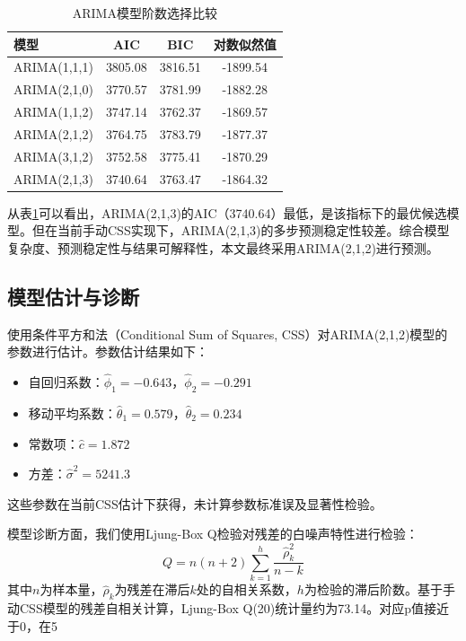 \documentclass[12pt,a4paper]{article}
\begin{document}
\begin{table}[H]
\centering
\caption{ARIMA模型阶数选择比较}
\label{tab:model_compare}
\small
\begin{tabular}{lccc}
\toprule
\textbf{模型} & \textbf{AIC} & \textbf{BIC} & \textbf{对数似然值} \\
\midrule
ARIMA(1,1,1) & 3805.08 & 3816.51 & -1899.54 \\
ARIMA(2,1,0) & 3770.57 & 3781.99 & -1882.28 \\
ARIMA(1,1,2) & 3747.14 & 3762.37 & -1869.57 \\
ARIMA(2,1,2) & 3764.75 & 3783.79 & -1877.37 \\
ARIMA(3,1,2) & 3752.58 & 3775.41 & -1870.29 \\
ARIMA(2,1,3) & 3740.64 & 3763.47 & -1864.32 \\
\bottomrule
\end{tabular}
\end{table}

从表\ref{tab:model_compare}可以看出，ARIMA(2,1,3)的AIC（3740.64）最低，是该指标下的最优候选模型。但在当前手动CSS实现下，ARIMA(2,1,3)的多步预测稳定性较差。综合模型复杂度、预测稳定性与结果可解释性，本文最终采用ARIMA(2,1,2)进行预测。

\subsection{模型估计与诊断}

使用条件平方和法（Conditional Sum of Squares, CSS）对ARIMA(2,1,2)模型的参数进行估计。参数估计结果如下：

\begin{itemize}
  \item 自回归系数：$\hat{\phi}_1 = -0.643$，$\hat{\phi}_2 = -0.291$
  \item 移动平均系数：$\hat{\theta}_1 = 0.579$，$\hat{\theta}_2 = 0.234$
  \item 常数项：$\hat{c} = 1.872$
  \item 方差：$\hat{\sigma}^2 = 5241.3$
\end{itemize}

这些参数在当前CSS估计下获得，未计算参数标准误及显著性检验。

模型诊断方面，我们使用Ljung-Box Q检验对残差的白噪声特性进行检验：
\begin{equation}
Q = n(n+2)\sum_{k=1}^{h}\frac{\hat{\rho}_k^2}{n-k}
\end{equation}
其中$n$为样本量，$\hat{\rho}_k$为残差在滞后$k$处的自相关系数，$h$为检验的滞后阶数。基于手动CSS模型的残差自相关计算，Ljung-Box Q(20)统计量约为73.14。对应p值接近于0，在5%
\end{document}
